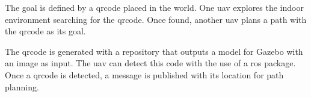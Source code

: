 The goal is defined by a \acs{qrcode} placed in the world. One \acs{uav} explores the indoor environment searching for the \acs{qrcode}. Once found, another \acs{uav} plans a path with the \acs{qrcode} as its goal.

The \acs{qrcode} is generated with a repository that outputs a model for Gazebo with an image as input. The \acs{uav} can detect this code with the use of a \acs{ros} package. Once a \acs{qrcode} is detected, a message is published with its location for path planning. \cite{github_ar_tags_gazebo} \cite{github_qr_detector}